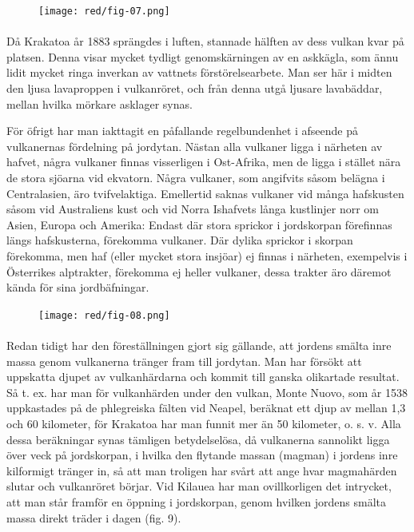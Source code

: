 \documentclass[a4paper, 12pt, oneside, swedish]{article}
\begin{document}
\begin{figure}[H]
\centering
\texttt{[image: red/fig-07.png]}
\caption{}
\end{figure}
\paragraph{}
Då Krakatoa år 1883 sprängdes i luften, stannade hälften av dess vulkan kvar på platsen. Denna visar mycket tydligt genomskärningen av en askkägla, som ännu lidit mycket ringa inverkan av vattnets förstörelsearbete. Man ser här i midten den ljusa lavaproppen i vulkanröret, och från denna utgå ljusare lavabäddar, mellan hvilka mörkare asklager synas.

För öfrigt har man iakttagit en påfallande regelbundenhet i afseende på vulkanernas fördelning på jordytan. Nästan alla vulkaner ligga i närheten av hafvet, några vulkaner finnas visserligen i Ost-Afrika, men de ligga i stället nära de stora sjöarna vid ekvatorn. Några vulkaner, som angifvits såsom belägna i Centralasien, äro tvifvelaktiga. Emellertid saknas vulkaner vid många hafskusten såsom vid Australiens kust och vid Norra Ishafvets långa kustlinjer norr om Asien, Europa och Amerika: Endast där stora sprickor i jordskorpan förefinnas längs hafskusterna, förekomma vulkaner. Där dylika sprickor i skorpan förekomma, men haf (eller mycket stora insjöar) ej finnas i närheten, exempelvis i Österrikes alptrakter, förekomma ej heller vulkaner, dessa trakter äro däremot kända för sina jordbäfningar.

\begin{figure}[H]
\centering
\texttt{[image: red/fig-08.png]}
\caption{}
\end{figure}
\paragraph{}
Redan tidigt har den föreställningen gjort sig gällande, att jordens smälta inre massa genom vulkanerna tränger fram till jordytan. Man har försökt att uppskatta djupet av vulkanhärdarna och kommit till ganska olikartade resultat. Så t. ex. har man för vulkanhärden under den vulkan, Monte Nuovo, som år 1538 uppkastades på de phlegreiska fälten vid Neapel, beräknat ett djup av mellan 1,3 och 60 kilometer, för Krakatoa har man funnit mer än 50 kilometer, o. s. v. Alla dessa beräkningar synas tämligen betydelselösa, då vulkanerna sannolikt ligga över veck på jordskorpan, i hvilka den flytande massan (magman) i jordens inre kilformigt tränger in, så att man troligen har svårt att ange hvar magmahärden slutar och vulkanröret börjar. Vid Kilauea har man ovillkorligen det intrycket, att man står framför en öppning i jordskorpan, genom hvilken jordens smälta massa direkt träder i dagen (fig. 9).
\end{document}
